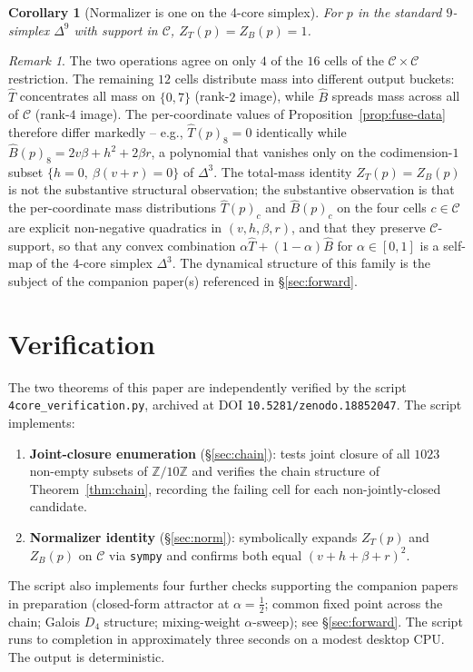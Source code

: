 \documentclass[11pt,reqno]{amsart}
\theoremstyle{plain}
\newtheorem{corollary}[theorem]{Corollary}
\theoremstyle{definition}
\theoremstyle{remark}
\newtheorem*{remark}{Remark}
\newcommand{\Z}{\mathbb{Z}}
\newcommand{\Zten}{\Z/10\Z}
\newcommand{\Cfour}{\mathcal{C}}
\newcommand{\Tfuse}{\widehat{T}}
\newcommand{\Bfuse}{\widehat{B}}
\begin{document}
\begin{corollary}[Normalizer is one on the 4-core simplex]\label{cor:Z=1}
For $p$ in the standard $9$-simplex $\Delta^{9}$ with support in
$\Cfour$, $Z_{T}(p)=Z_{B}(p)=1$.
\end{corollary}

\begin{remark}\label{rem:rank-disparity-detailed}
The two operations agree on only $4$ of the $16$ cells of the
$\Cfour\times\Cfour$ restriction. The remaining $12$ cells
distribute mass into different output buckets:
$\Tfuse$ concentrates all mass on $\{0, 7\}$ (rank-$2$ image),
while $\Bfuse$ spreads mass across all of $\Cfour$
(rank-$4$ image). The per-coordinate values of
Proposition~\ref{prop:fuse-data} therefore differ markedly --
e.g., $\Tfuse(p)_{8} = 0$ identically while $\Bfuse(p)_{8} =
2v\beta + h^{2} + 2\beta r$, a polynomial that vanishes only on
the codimension-$1$ subset $\{h = 0,\ \beta(v + r) = 0\}$ of
$\Delta^{3}$. The total-mass identity $Z_{T}(p) = Z_{B}(p)$ is
not the substantive structural observation; the substantive
observation is that the per-coordinate mass distributions
$\Tfuse(p)_{c}$ and $\Bfuse(p)_{c}$ on the four cells $c\in\Cfour$
are explicit non-negative quadratics in
$(v, h, \beta, r)$, and that they preserve $\Cfour$-support, so
that any convex combination $\alpha\Tfuse + (1-\alpha)\Bfuse$ for
$\alpha\in[0,1]$ is a self-map of the $4$-core simplex
$\Delta^{3}$. The dynamical structure of this family is the
subject of the companion paper(s) referenced in
\S\ref{sec:forward}.
\end{remark}

\section{Verification}\label{sec:verify}

The two theorems of this paper are independently verified by the
script \texttt{4core\_verification.py}, archived at DOI
\texttt{10.5281/zenodo.18852047}. The script implements:
\begin{enumerate}\setlength\itemsep{0pt}
\item \textbf{Joint-closure enumeration} (\S\ref{sec:chain}):
tests joint closure of all $1023$ non-empty subsets of $\Zten$
and verifies the chain structure of Theorem~\ref{thm:chain},
recording the failing cell for each non-jointly-closed
candidate.
\item \textbf{Normalizer identity} (\S\ref{sec:norm}): symbolically
expands $Z_{T}(p)$ and $Z_{B}(p)$ on $\Cfour$ via \texttt{sympy}
and confirms both equal $(v+h+\beta+r)^{2}$.
\end{enumerate}
The script also implements four further checks supporting the
companion papers in preparation (closed-form attractor at
$\alpha=\tfrac12$; common fixed point across the chain; Galois
$D_{4}$ structure; mixing-weight $\alpha$-sweep); see
\S\ref{sec:forward}. The script runs to completion in
approximately three seconds on a modest desktop CPU. The output
is deterministic.
\end{document}

